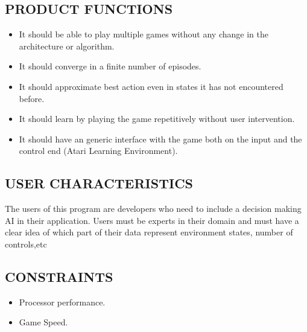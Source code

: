 \documentclass[twoside,letterpaper]{article}
\begin{document}
{\subsection[PRODUCT
FUNCTIONS]{\rmfamily\bfseries\color{black}
PRODUCT FUNCTIONS}
{\color{black}
\begin{itemize}
      \item It should be able to play multiple games without any change in the architecture or algorithm.
      \item It should converge in a finite number of episodes.
      \item It should approximate best action even in states it has not encountered before.
      \item It should learn by playing the game repetitively without user intervention.
      \item It should have an generic interface with the game both on the input and the control end (Atari Learning Environment).
  \end{itemize}
}

\subsection[USER
CHARACTERISTICS]{\rmfamily\bfseries\color{black}
USER CHARACTERISTICS}

{\color{black}
The users of this program are developers who need to include a decision making AI in their application. Users must be experts in their domain and must have a clear idea of which part of their data represent environment states, number of controls,etc}

\subsection[CONSTRAINTS]{\rmfamily\bfseries\color{black}
CONSTRAINTS}

{\color{black}
\begin{itemize}
      \item Processor performance.
      \item Game Speed.
  \end{itemize}}



\clearpage
}
\end{document}

